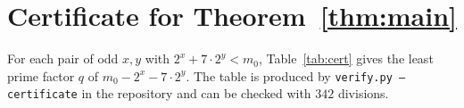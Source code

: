 \documentclass[11pt]{article}
\theoremstyle{definition}
\theoremstyle{remark}
\newcommand{\mz}{m_0}
\begin{document}
\appendix
\section{Certificate for Theorem~\ref{thm:main}}

For each pair of odd $x,y$ with $2^x+7\cdot 2^y<\mz$, Table~\ref{tab:cert} gives the least prime
factor $q$ of $\mz-2^x-7\cdot 2^y$. The table is produced by \texttt{verify.py --certificate} in the
repository and can be checked with $342$ divisions.

\begin{table}[p]
\centering
\scriptsize
\setlength{\tabcolsep}{3pt}

\caption{Least prime factor $q$ of $445466268731-2^x-7\cdot 2^y$ for all $342$ pairs of odd $x,y$.}
\label{tab:cert}
\end{table}
\end{document}
